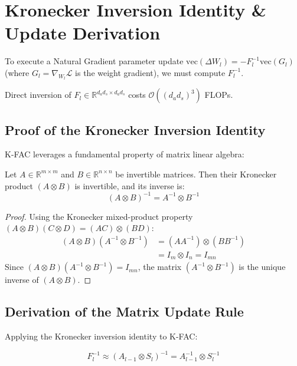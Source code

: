 \section{Kronecker Inversion Identity \& Update Derivation}
To execute a Natural Gradient parameter update $\text{vec}(\Delta W_l) = - F_l^{-1} \text{vec}(G_l)$ (where $G_l = \nabla_{W_l} \mathcal{L}$ is the weight gradient), we must compute $F_l^{-1}$.

Direct inversion of $F_l \in \mathbb{R}^{d_a d_s \times d_a d_s}$ costs $\mathcal{O}((d_a d_s)^3)$ FLOPs.

\subsection{Proof of the Kronecker Inversion Identity}
K-FAC leverages a fundamental property of matrix linear algebra:

\begin{theorem}
Let $A \in \mathbb{R}^{m \times m}$ and $B \in \mathbb{R}^{n \times n}$ be invertible matrices. Then their Kronecker product $(A \otimes B)$ is invertible, and its inverse is:
$$(A \otimes B)^{-1} = A^{-1} \otimes B^{-1}$$
\end{theorem}

\begin{proof}
Using the Kronecker mixed-product property $(A \otimes B)(C \otimes D) = (AC) \otimes (BD)$:
\begin{align}
(A \otimes B) (A^{-1} \otimes B^{-1}) &= (A A^{-1}) \otimes (B B^{-1}) \\
&= I_m \otimes I_n = I_{mn}
\end{align}
Since $(A \otimes B)(A^{-1} \otimes B^{-1}) = I_{mn}$, the matrix $(A^{-1} \otimes B^{-1})$ is the unique inverse of $(A \otimes B)$.
\end{proof}

\subsection{Derivation of the Matrix Update Rule}
Applying the Kronecker inversion identity to K-FAC:

\begin{equation}
F_l^{-1} \approx (A_{l-1} \otimes S_l)^{-1} = A_{l-1}^{-1} \otimes S_l^{-1}
\end{equation}

